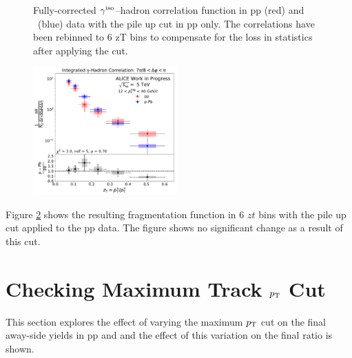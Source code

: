 \begin{figure}
\caption{Fully-corrected $\gamma^\mathrm{iso}$--hadron correlation function in pp (red) and \pPb~(blue) data with the pile up cut in pp only. The correlations have been rebinned to 6 zT bins to compensate for the loss in statistics after applying the cut.}
\label{fig:Correlation_pileup}
\end{figure}

\begin{figure}
\centering
\includegraphics[width=0.49\textwidth]{G-H_New/zT_Rebin_6_006zT06zTpileCut/Final_FFunction_and_Ratio.pdf}
\label{fig:FF_pileup}
\end{figure}


Figure \ref{fig:FF_pileup} shows the resulting fragmentation function in 6 $zt$ bins with the pile up cut applied to the pp data. The figure shows no significant change as a result of this cut.


\section{Checking Maximum Track $p_{\mathrm{T}}$ Cut}
This section explores the effect of varying the maximum $p_{\mathrm{T}}$ cut on the final away-side yields in pp and \pPb and the effect of this variation on the final ratio is shown.

